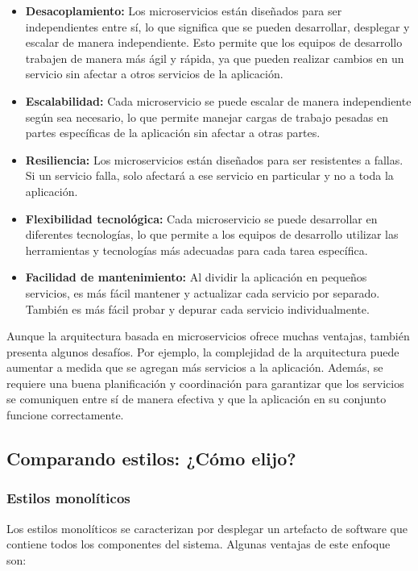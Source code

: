 \documentclass[executivepaper]{article}
\begin{document}
\begin{itemize}
\item \textbf{Desacoplamiento:} Los microservicios están diseñados para ser independientes entre sí, lo que significa que se pueden desarrollar, desplegar y escalar de manera independiente. Esto permite que los equipos de desarrollo trabajen de manera más ágil y rápida, ya que pueden realizar cambios en un servicio sin afectar a otros servicios de la aplicación.
\item \textbf{Escalabilidad:} Cada microservicio se puede escalar de manera independiente según sea necesario, lo que permite manejar cargas de trabajo pesadas en partes específicas de la aplicación sin afectar a otras partes.
\item \textbf{Resiliencia:} Los microservicios están diseñados para ser resistentes a fallas. Si un servicio falla, solo afectará a ese servicio en particular y no a toda la aplicación.
\item \textbf{Flexibilidad tecnológica:} Cada microservicio se puede desarrollar en diferentes tecnologías, lo que permite a los equipos de desarrollo utilizar las herramientas y tecnologías más adecuadas para cada tarea específica.
\item \textbf{Facilidad de mantenimiento:} Al dividir la aplicación en pequeños servicios, es más fácil mantener y actualizar cada servicio por separado. También es más fácil probar y depurar cada servicio individualmente.
\end{itemize}

Aunque la arquitectura basada en microservicios ofrece muchas ventajas, también presenta algunos desafíos. Por ejemplo, la complejidad de la arquitectura puede aumentar a medida que se agregan más servicios a la aplicación. Además, se requiere una buena planificación y coordinación para garantizar que los servicios se comuniquen entre sí de manera efectiva y que la aplicación en su conjunto funcione correctamente.

\subsection*{Comparando estilos: ¿Cómo elijo?}

\subsubsection*{Estilos monolíticos}

Los estilos monolíticos se caracterizan por desplegar un artefacto de software que contiene todos los componentes del sistema. Algunas ventajas de este enfoque son:
\end{document}
